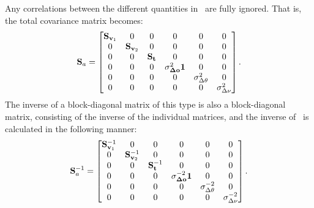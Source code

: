 Any correlations between the different quantities in \SttVct\ are fully
ignored. That is, the total covariance matrix becomes:
\begin{equation}
  \label{eq:sa}
  \mathbf{S}_{a} =
  \begin{bmatrix}
    \mathbf{S}_{\mathbf{v}_1} & 0 & 0 & 0 & 0 & 0 \\
    0 & \mathbf{S}_{\mathbf{v}_2} & 0 & 0 & 0 & 0 \\
    0 & 0 & \mathbf{S}_{\mathbf{t}} & 0 & 0 & 0 \\
    0 & 0 & 0 & \sigma_{\mathbf{\Delta\mathbf{o}}}^2\mathbf{1} & 0 & 0 \\
    0 & 0 & 0 & 0 & \sigma_{\Delta\theta}^2 & 0 \\
    0 & 0 & 0 & 0 & 0 & \sigma_{\Delta\nu}^2 \\
  \end{bmatrix}.
\end{equation}
The inverse of a block-diagonal matrix of this type is also a block-diagonal
matrix, consisting of the inverse of the individual matrices, and the inverse
of \ is calculated in the following manner:
\begin{equation}
  \label{eq:sainv}
  \mathbf{S}_{a}^{-1} =
  \begin{bmatrix}
    \mathbf{S}_{\mathbf{v}_1}^{-1} & 0 & 0 & 0 & 0 & 0 \\
    0 & \mathbf{S}_{\mathbf{v}_2}^{-1} & 0 & 0 & 0 & 0 \\
    0 & 0 & \mathbf{S}_{\mathbf{t}}^{-1} & 0 & 0 & 0 \\
    0 & 0 & 0 & \sigma_{\mathbf{\Delta\mathbf{o}}}^{-2}\mathbf{1} & 0 & 0 \\
    0 & 0 & 0 & 0 & \sigma_{\Delta\theta}^{-2} & 0 \\
    0 & 0 & 0 & 0 & 0 & \sigma_{\Delta\nu}^{-2} \\
  \end{bmatrix}.
\end{equation}






